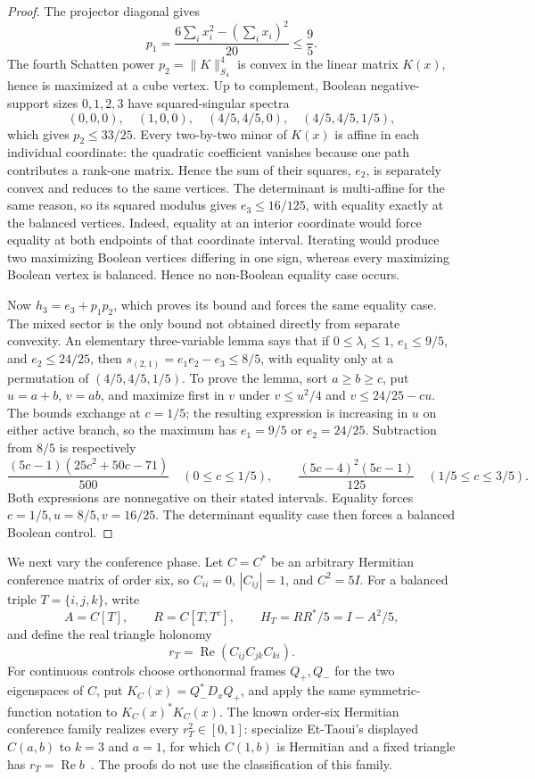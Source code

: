 \documentclass[11pt]{article}
\theoremstyle{remark}
\begin{document}
\begin{proof}
The projector diagonal gives
\[
 p_1=\frac{6\sum_i x_i^2-(\sum_i x_i)^2}{20}\le\frac95.
\]
The fourth Schatten power \(p_2=\lVert K\rVert_{S_4}^4\) is convex in
the linear matrix \(K(x)\), hence is maximized at a cube vertex.  Up to
complement, Boolean negative-support sizes \(0,1,2,3\) have squared-singular
spectra
\[
 (0,0,0),\quad(1,0,0),\quad(4/5,4/5,0),\quad(4/5,4/5,1/5),
\]
which gives \(p_2\le33/25\).  Every two-by-two minor of
\(K(x)\) is affine in each individual coordinate: the quadratic coefficient
vanishes because one path contributes a rank-one matrix.  Hence the sum of
their squares, \(e_2\), is separately convex and reduces to the same vertices.
The determinant is multi-affine for the same reason, so its squared modulus
gives \(e_3\le16/125\), with equality exactly at the balanced vertices.
Indeed, equality at an interior coordinate would force equality at both
endpoints of that coordinate interval.  Iterating would produce two
maximizing Boolean vertices differing in one sign, whereas every maximizing
Boolean vertex is balanced.  Hence no non-Boolean equality case occurs.

Now \(h_3=e_3+p_1p_2\), which proves its bound and forces the same equality
case.  The mixed sector is the only bound not obtained directly from separate
convexity.  An elementary three-variable lemma says that if
\(0\le\lambda_i\le1\), \(e_1\le9/5\), and \(e_2\le24/25\), then
\(s_{(2,1)}=e_1e_2-e_3\le8/5\), with equality only at a permutation of
\((4/5,4/5,1/5)\).  To prove the lemma, sort \(a\ge b\ge c\), put
\(u=a+b\), \(v=ab\), and maximize first in \(v\) under
\(v\le u^2/4\) and \(v\le24/25-cu\).  The bounds exchange at \(c=1/5\);
the resulting expression is increasing in \(u\) on either active branch, so
the maximum has \(e_1=9/5\) or \(e_2=24/25\).  Subtraction from
\(8/5\) is respectively
\[
 \frac{(5c-1)(25c^2+50c-71)}{500}
 \quad(0\le c\le1/5),\qquad
 \frac{(5c-4)^2(5c-1)}{125}
 \quad(1/5\le c\le3/5).
\]
Both expressions are nonnegative on their stated intervals.  Equality forces
\(c=1/5,u=8/5,v=16/25\).  The determinant equality case then forces a
balanced Boolean control.
\end{proof}

We next vary the conference phase.  Let \(C=C^*\) be an arbitrary Hermitian
conference matrix of order six, so \(C_{ii}=0\), \(|C_{ij}|=1\), and
\(C^2=5I\).  For a balanced triple \(T=\{i,j,k\}\), write
\[
 A=C[T],\qquad R=C[T,T^c],\qquad
 H_T=RR^*/5=I-A^2/5,
\]
and define the real triangle holonomy
\[
 r_T=\operatorname{Re}(C_{ij}C_{jk}C_{ki}).
\]
For continuous controls choose orthonormal frames \(Q_+,Q_-\) for the two
eigenspaces of \(C\), put \(K_C(x)=Q_-^*D_xQ_+\), and apply the same
symmetric-function notation to \(K_C(x)^*K_C(x)\).
The known order-six Hermitian conference family realizes every
\(r_T^2\in[0,1]\): specialize Et-Taoui's displayed \(C(a,b)\) to
\(k=3\) and \(a=1\), for which \(C(1,b)\) is Hermitian and a fixed triangle
has \(r_T=\operatorname{Re}b\)~\cite[Theorems~2 and~6]{EtTaouiConference}.
The proofs do not use the classification of this family.
\end{document}
